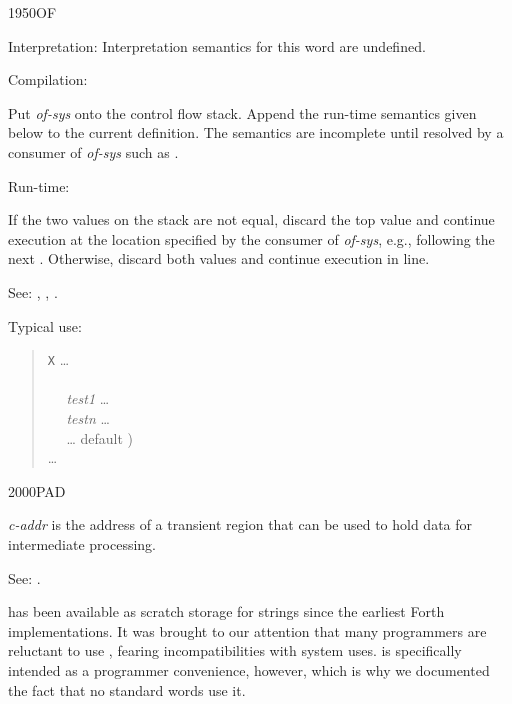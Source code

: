 \begin{newword*}{1950}{OF}
\item[Interpretation:]
	Interpretation semantics for this word are undefined.

\item[Compilation:]

	Put \emph{of-sys} onto the control flow stack. Append the
	run-time semantics given below to the current definition.
	The semantics are incomplete until resolved by a consumer
	of \emph{of-sys} such as .

\item[Run-time:]

	If the two values on the stack are not equal, discard the
	top value and continue execution at the location specified
	by the consumer of \emph{of-sys}, e.g., following the next
	. Otherwise, discard both values and continue
	execution in line.

\item[See:]
	,
	,
	.

	\begin{rationale} %
		Typical use:
		\begin{quote}
			\word{:} \texttt{X} {\ldots} \\
			\tab {} \\
			\tab~~ \emph{test1}  {\ldots}  \\
			\tab~~ \emph{testn}  {\ldots}  \\
			\tab~~ {\ldots}  default ) \\
			\tab {} {\ldots} \\
			\word{;}
		\end{quote}
	\end{rationale}
\end{newword*}


\begin{newword}{2000}{PAD}

	\emph{c-addr} is the address of a transient region that can
	be used to hold data for intermediate processing.

\item[See:]
	.

	\begin{rationale} %
		 has been available as scratch storage for strings
		since the earliest Forth implementations. It was brought to
		our attention that many programmers are reluctant to use
		, fearing incompatibilities with system uses.
		 is specifically intended as a programmer convenience,
		however, which is why we documented the fact that no standard
		words use it.
	\end{rationale}
\end{newword}


